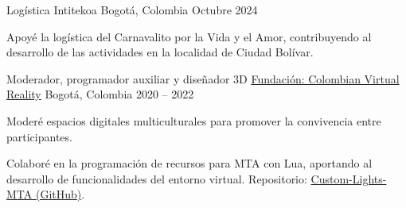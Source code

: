 

\begin{cventries}
\cventry
    {Logística} %
    {Intitekoa} %
    {Bogotá, Colombia} %
    {Octubre 2024} %
    {
      \begin{cvitems} %
      \item {Apoyé la logística del Carnavalito por la Vida y el Amor, contribuyendo al desarrollo de las actividades en la localidad de Ciudad Bolívar.}
      \end{cvitems}
        }
\cventry
    {Moderador, programador auxiliar y diseñador 3D} %
    {\href{https://www.colombianvirtualreality.com/}{Fundación: Colombian Virtual Reality}} %
    {Bogotá, Colombia} %
    {2020 -- 2022} %
    {
      \begin{cvitems} %
      \item {Moderé espacios digitales multiculturales para promover la convivencia entre participantes.}
      \item {Colaboré en la programación de recursos para MTA con Lua, aportando al desarrollo de funcionalidades del entorno virtual. Repositorio: \href{https://github.com/dokiun/Custom-Lights-MTA}{Custom-Lights-MTA (GitHub)}.}
      \end{cvitems}
    }

\end{cventries}
